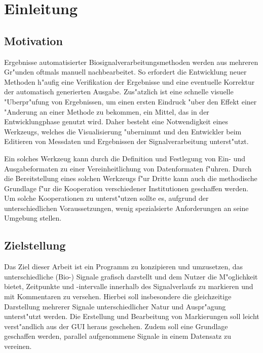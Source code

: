 \chapter{Einleitung}

\section{Motivation}

Ergebnisse automatisierter Biosignalverarbeitungsmethoden werden aus mehreren Gr"unden oftmals manuell nachbearbeitet.
So erfordert die Entwicklung neuer Methoden h"aufig eine Verifikation der Ergebnisse und eine eventuelle Korrektur der automatisch generierten Ausgabe.
Zus"atzlich ist eine schnelle visuelle "Uberpr"ufung von Ergebnissen, um einen ersten Eindruck "uber den Effekt einer "Anderung an einer Methode zu bekommen, ein Mittel, das in der Entwicklungphase genutzt wird.
Daher besteht eine Notwendigkeit eines Werkzeugs, welches die Visualisierung "ubernimmt und den Entwickler beim Editieren von Messdaten und Ergebnissen der Signalverarbeitung unterst"utzt.

Ein solches Werkzeug kann durch die Definition und Festlegung von Ein- und Ausgabeformaten zu einer Vereinheitlichung von Datenformaten f"uhren.
Durch die Bereitstellung eines solchen Werkzeugs f"ur Dritte kann auch die methodische Grundlage f"ur die Kooperation verschiedener Institutionen geschaffen werden.
Um solche Kooperationen zu unterst"utzen sollte es, aufgrund der unterschiedlichen Voraussetzungen, wenig spezialsierte Anforderungen an seine Umgebung stellen.



\section{Zielstellung}
\label{sec:zielstellung}

Das Ziel dieser Arbeit ist ein Programm zu konzipieren und umzusetzen, das unterschiedliche (Bio-) Signale grafisch darstellt und dem Nutzer die M"oglichkeit bietet, Zeitpunkte und -intervalle innerhalb des Signalverlaufs zu markieren und mit Kommentaren zu versehen.
Hierbei soll insbesondere die gleichzeitige Darstellung mehrerer Signale unterschiedlicher Natur und Auspr"agung unterst"utzt werden.
Die Erstellung und Bearbeitung von Markierungen soll leicht verst"andlich aus der \ac{GUI} heraus geschehen.
Zudem soll eine Grundlage geschaffen werden, parallel aufgenommene Signale in einem Datensatz zu vereinen.


